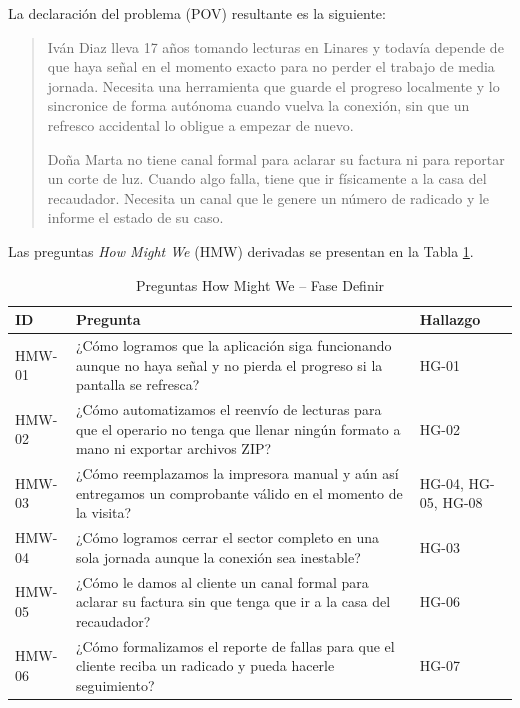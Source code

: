 \documentclass[12pt, a4paper]{article}
\begin{document}
\vspace{6pt}
\noindent La declaración del problema (POV) resultante es la siguiente:

\begin{quote}
Iván Diaz lleva 17 años tomando lecturas en Linares y todavía depende de que haya señal en el momento exacto para no perder el trabajo de media jornada. Necesita una herramienta que guarde el progreso localmente y lo sincronice de forma autónoma cuando vuelva la conexión, sin que un refresco accidental lo obligue a empezar de nuevo.

Doña Marta no tiene canal formal para aclarar su factura ni para reportar un corte de luz. Cuando algo falla, tiene que ir físicamente a la casa del recaudador. Necesita un canal que le genere un número de radicado y le informe el estado de su caso.
\end{quote}

\vspace{6pt}
\noindent Las preguntas \textit{How Might We} (HMW) derivadas se presentan en la Tabla \ref{tab:hmw}.

\begin{table}[H]
  \caption{Preguntas How Might We -- Fase Definir}
  \label{tab:hmw}
  \centering
  \small
  \begin{tabular}{p{1.2cm} p{9.8cm} p{2.5cm}}
    \toprule
    \textbf{ID} & \textbf{Pregunta} & \textbf{Hallazgo} \\
    \midrule
    HMW-01 & ¿Cómo logramos que la aplicación siga funcionando aunque no haya señal y no pierda el progreso si la pantalla se refresca? & HG-01 \\
    HMW-02 & ¿Cómo automatizamos el reenvío de lecturas para que el operario no tenga que llenar ningún formato a mano ni exportar archivos ZIP? & HG-02 \\
    HMW-03 & ¿Cómo reemplazamos la impresora manual y aún así entregamos un comprobante válido en el momento de la visita? & HG-04, HG-05, HG-08 \\
    HMW-04 & ¿Cómo logramos cerrar el sector completo en una sola jornada aunque la conexión sea inestable? & HG-03 \\
    HMW-05 & ¿Cómo le damos al cliente un canal formal para aclarar su factura sin que tenga que ir a la casa del recaudador? & HG-06 \\
    HMW-06 & ¿Cómo formalizamos el reporte de fallas para que el cliente reciba un radicado y pueda hacerle seguimiento? & HG-07 \\
    \bottomrule
  \end{tabular}
\end{table}
\end{document}
